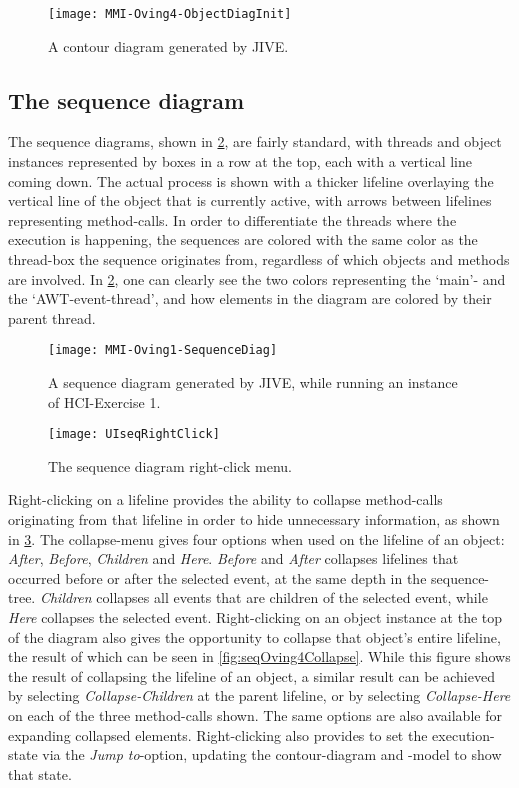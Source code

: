 \begin{figure}[H]
	\centering
	\texttt{[image: MMI-Oving4-ObjectDiagInit]}
	\caption{A contour diagram generated by JIVE.}
	\label{fig:contOving4Init}
\end{figure}

\subsection{The sequence diagram}\label{jiveFeatSequenceDiag}

The sequence diagrams, shown in \cref{fig:seqOving1}, are fairly standard, with threads and object instances represented by boxes in a row at the top, each with a vertical line coming down.
The actual process is shown with a thicker lifeline overlaying the vertical line of the object that is currently active, with arrows between lifelines representing method-calls.
In order to differentiate the threads where the execution is happening, the sequences are colored with the same color as the thread-box the sequence originates from, regardless of which objects and methods are involved.
In \cref{fig:seqOving1}, one can clearly see the two colors representing the `main'- and the `AWT-event-thread', and how elements in the diagram are colored by their parent thread.

\begin{figure}[H]
	\centering
	\texttt{[image: MMI-Oving1-SequenceDiag]}
	\caption{A sequence diagram generated by JIVE, while running an instance of HCI-Exercise 1.}
	\label{fig:seqOving1}
\end{figure}

\begin{figure}[H]
	\centering
	\texttt{[image: UIseqRightClick]}
	\caption{The sequence diagram right-click menu.}
	\label{fig:UIseqRightClick}
\end{figure}

Right-clicking on a \gls{lifeline} provides the ability to collapse method-calls originating from that lifeline in order to hide unnecessary information, as shown in \cref{fig:UIseqRightClick}.
The collapse-menu gives four options when used on the lifeline of an object: \emph{After}, \emph{Before}, \emph{Children} and \emph{Here}.
\emph{Before} and \emph{After} collapses lifelines that occurred before or after the selected event, at the same depth in the sequence-tree.
\emph{Children} collapses all events that are children of the selected event, while \emph{Here} collapses the selected event.
Right-clicking on an object instance at the top of the diagram also gives the opportunity to collapse that object's entire lifeline, the result of which can be seen in \cref{fig:seqOving4Collapse}.
While this figure shows the result of collapsing the lifeline of an object, a similar result can be achieved by selecting \emph{Collapse-Children} at the parent lifeline, or by selecting \emph{Collapse-Here} on each of the three method-calls shown.
The same options are also available for expanding collapsed elements.
Right-clicking also provides to set the execution-state via the \emph{Jump to}-option, updating the contour-diagram and -model to show that state.

